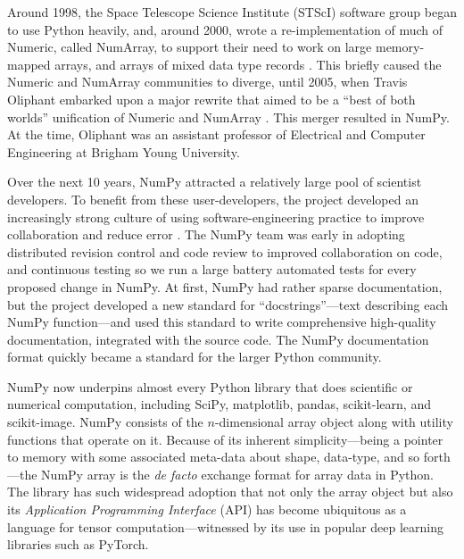 

Around 1998, the Space Telescope Science Institute (STScI) software group began
to use Python heavily, and, around 2000, wrote a re-implementation of much of
Numeric, called NumArray, to support their need to work on large memory-mapped
arrays, and arrays of mixed data type records \cite{STScI-slither}.  This
briefly caused the Numeric and NumArray communities to diverge, until 2005,
when Travis Oliphant embarked upon a major rewrite that aimed to be a ``best of
both worlds'' unification of Numeric and NumArray \cite{oliphant2006guide}.
This merger resulted in NumPy.  At the time, Oliphant was an assistant
professor of Electrical and Computer Engineering at Brigham Young University.

Over the next 10 years, NumPy attracted a relatively large pool of scientist
developers.  To benefit from these
user-developers, the project developed an increasingly strong culture of using
software-engineering practice to improve collaboration and reduce error
\cite{millman2014developing}. The NumPy team was early in adopting distributed
revision control and code review to improved collaboration on code, and
continuous testing so we run a large battery automated tests for every proposed
change in NumPy. At first, NumPy had rather sparse documentation, but the project
developed a new standard for ``docstrings''---text describing each NumPy
function---and used this standard to write comprehensive high-quality
documentation, integrated with the source code. The NumPy documentation format
quickly became a standard for the larger Python community.

NumPy now underpins almost every Python library that does scientific or
numerical computation, including SciPy\cite{virtanen2019scipy},
matplotlib\cite{hunter2007matplotlib}, pandas\cite{mckinney-proc-scipy-2010},
scikit-learn\cite{pedregosa2011scikit}, and
scikit-image\cite{vanderwalt2014scikit}.
NumPy consists of the $n$-dimensional array object along with utility functions
that operate on it.
Because of its inherent simplicity---being a pointer to memory with some
associated meta-data about shape, data-type, and so forth---the NumPy array is
the {\it de facto} exchange format for array data in Python.
The library has such widespread adoption that not only the array object but also its
{\it Application Programming Interface} (API) has become ubiquitous as
a language for tensor computation---witnessed by its use in popular
deep learning libraries such as PyTorch\cite{pytorch}.

